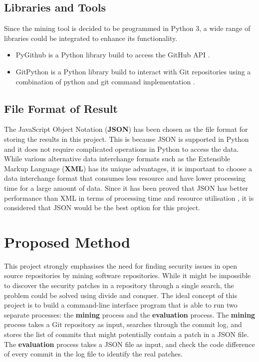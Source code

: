 \documentclass[12pt, a4paper]{report}
\begin{document}
\subsection{Libraries and Tools}
Since the mining tool is decided to be programmed in Python 3, a wide range of libraries could be
integrated to enhance its functionality.
\begin{itemize}
	\item PyGithub is a Python library build to access the GitHub API \cite{pygithub}.
	\item GitPython is a Python library build to interact with Git repositories using a combination of
	python and git command implementation \cite{gitpython}.
\end{itemize}

\subsection{File Format of Result} \label{subsec:file_format}
The JavaScript Object Notation (\textbf{JSON}) \cite{json} has been chosen as the file format for
storing the results in this project. This is because JSON is supported in Python and it does not
require complicated operations in Python to access the data. While various alternative data
interchange formats such as the Extensible Markup Language (\textbf{XML}) \cite{xml} has its unique
advantages, it is important to choose a data interchange format that consumes less resource and have
lower processing time for a large amount of data. Since it has been proved that JSON has better
performance than XML in terms of processing time and resource utilisation \cite{nurseitov_2009}, it
is considered that JSON would be the best option for this project.

\section{Proposed Method}
This project strongly emphasises the need for finding security issues in open source repositories by
mining software repositories. While it might be impossible to discover the security patches in a
repository through a single search, the problem could be solved using divide and conquer. The ideal
concept of this project is to build a command-line interface program that is able to run two
separate processes: the \textbf{mining} process and the \textbf{evaluation} process. The
\textbf{mining} process takes a Git repository as input, searches through the commit log, and stores
the list of commits that might potentially contain a patch in a JSON file. The \textbf{evaluation}
process takes a JSON file as input, and check the code difference of every commit in the log file to
identify the real patches.
\end{document}
